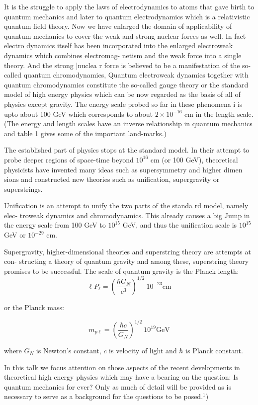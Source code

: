 It is the struggle to apply the laws of electrodynamics to atoms that gave
birth to quantum mechanics and later to quantum electrodynamics which is a relativistic quantum
field theory. Now we have enlarged the domain of applicability of quantum mechanics
to cover the weak and strong nuclear forces as well. In fact electro
dynamics itself has
been incorporated into the enlarged electroweak dynamics which
combines electromag-
netism and the weak force into a single theory. And the strong |nuclea
r force is believed
to be a manifestation of the so-called quantum chromodynamics,
Quantum electroweak
dynamics together with quantum chromodynamics constitute
the so-called gauge theory
or the standard model of high energy physics which can be now
regarded as the basis of
all of physics except gravity. The energy scale probed so far
in these phenomena i is upto
about 100 GeV which corresponds to about $2 \times 10^{-16}$ cm in the
length scale. (The energy
and length scales have an inverse relationship in quantum
mechanics and table 1 gives
some of the important land-marks.)

The established part of physics stops at the standard model.
In their attempt to probe
deeper regions of space-time beyond $10^{16}$ cm (or 100 GeV),
theoretical physicists have
invented many ideas such as supersymmetry and higher dimen
sions and constructed new
theories such as unification, supergravity or superstrings.

Unification is an attempt to unify the two parts of the standa
rd model, namely elec-
troweak dynamics and chromodynamics. This already causes
a big Jump in the energy
scale from 100 GeV to $10^{15}$ GeV, and thus the unification scale
is $10^{15}$ GeV or $10^{-29}$ cm.

Supergravity, higher-dimensional theories and superstring theory are attempts at con-
structing a theory of quantum gravity and among these, superstring theory promises to be
successful. The scale of quantum gravity is the Planck length:
$$
\ell P_{\ell} = \left(\dfrac{\hbar G_{N}}{c^{3}} \right)^{1/2} ~10^{-23} {\text{cm}}
$$

or the Planck mass:

$$
m_{p \ell} = \left(\frac{\hbar c}{G_{N}} \right)^{1/2} ~10^{19} \text{GeV}
$$

where $G_{N}$ is Newton’s constant, $c$ is velocity of light and $\hbar$ is Planck constant.

In this talk we focus attention on those aspects of the recent developments in theoretical
high energy physics which may have a bearing on the question: Is quantum mechanics
for
ever? Only as much of detail will be provided as is necessary to serve as a background for
the questions to be posed.$^{1}$)


